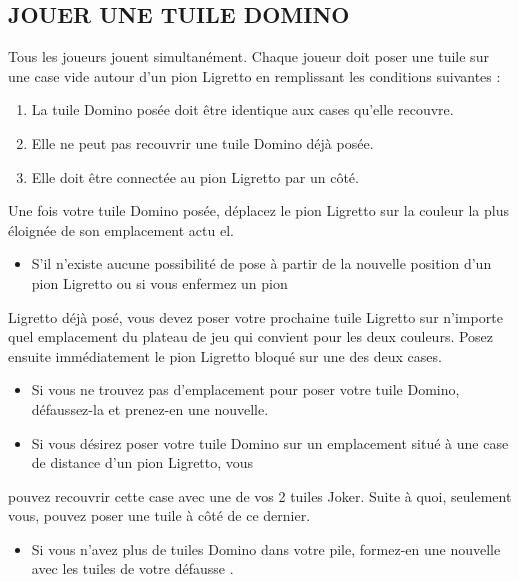 \documentclass{article}%
\begin{document}
\subsection{ JOUER UNE TUILE DOMINO
}%
\label{subsec:JOUERUNETUILEDOMINO}%
Tous les joueurs jouent simultanément.
%
Chaque joueur doit poser une tuile sur une case vide autour d'un pion Ligretto en remplissant
%
les conditions suivantes :
%
\begin{enumerate}%
\item%
%
 La tuile Domino posée doit être identique aux cases qu'elle recouvre.
%
\item%
%
 Elle ne peut pas recouvrir une tuile Domino déjà posée.
%
\item%
%
 Elle doit être connectée au pion Ligretto par un côté.
%
\end{enumerate}%
Une fois votre tuile Domino posée, déplacez le pion Ligretto sur la couleur la plus éloignée de son
%
emplacement actu el.
%
\begin{itemize}%
\item%
%
 S'il n'existe aucune possibilité de pose à partir de la nouvelle position d'un pion Ligretto ou si vous enfermez un pion
%
\end{itemize}%
Ligretto déjà posé, vous devez poser votre prochaine tuile Ligretto sur n’importe quel emplacement du plateau de jeu
%
qui convient pour les deux couleurs. Posez ensuite immédiatement le pion Ligretto bloqué sur une des deux cases.
%
\begin{itemize}%
\item%
%
 Si vous ne trouvez pas d'emplacement pour poser votre tuile Domino, défaussez{-}la et prenez{-}en une nouvelle.
%
\item%
%
 Si vous désirez poser votre tuile Domino sur un emplacement situé à une case de distance d'un pion Ligretto, vous
%
\end{itemize}%
pouvez recouvrir cette case avec une de vos 2 tuiles Joker. Suite à quoi, seulement vous, pouvez poser une tuile à
%
côté de ce dernier.
%
\begin{itemize}%
\item%
%
 Si vous n'avez plus de tuiles Domino dans votre pile, formez{-}en une nouvelle avec les tuiles de votre défausse .
%
\end{itemize}

%
\end{document}
